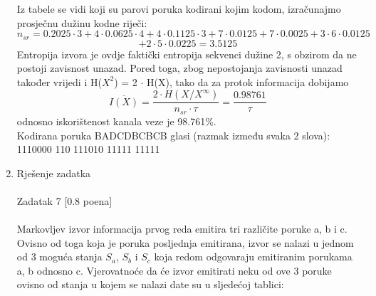 \documentclass[12pt]{article}
\begin{document}
\begin{enumerate}
Iz tabele se vidi koji su parovi poruka kodirani kojim kodom, izračunajmo
prosječnu dužinu kodne riječi:
\begin{equation*}
    n_{sr} = 0.2025\cdot3 + 4\cdot0.0625\cdot4 + 4\cdot0.1125\cdot3 + 7\cdot0.0125 + 7\cdot0.0025 + 3\cdot6\cdot0.0125
\end{equation*}
\begin{equation*}
    + 2\cdot5\cdot0.0225 = 3.5125
\end{equation*}
Entropija izvora je ovdje faktički entropija sekvenci dužine 2, s obzirom
da ne postoji zavisnost unazad. Pored toga, zbog nepostojanja zavisnosti unazad 
također vrijedi i H($X^2$) = 2 ${\cdot}$ H(X), tako da za protok
informacija dobijamo
\begin{equation*}
    \overline{I(X)} = \frac{2 \cdot H(X/X^\infty)}{n_{sr} \cdot \tau} = \frac{0.98761}{\tau}
\end{equation*}
odnosno iskorištenost kanala veze je 98.761\%. \\
Kodirana poruka BADCDBCBCB glasi (razmak između svaka 2 slova): \\
1110000 110 111010 11111 11111
\\
		\newpage
		\item Rješenje zadatka \\
		\\
		Zadatak 7 [0.8 poena] \\
        \\
Markovljev izvor informacija prvog reda emitira tri različite poruke a, b i c. Ovisno od toga koja je poruka posljednja emitirana, izvor se nalazi u jednom od 3 moguća stanja $S_a$, $S_b$ i $S_c$ koja redom odgovaraju emitiranim porukama a, b odnosno c. Vjerovatnoće da će izvor emitirati neku od ove 3 poruke ovisno od stanja u kojem se nalazi date su u sljedećoj tablici: \\
		

\end{enumerate}
\end{document}
